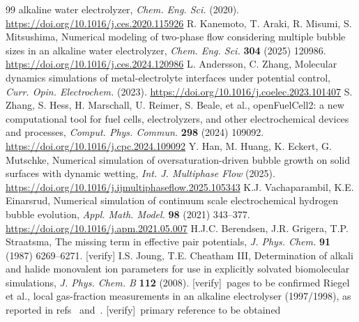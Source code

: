 \documentclass[11pt,a4paper]{article}
\newcommand{\verifyc}{\textcolor{brick}{\footnotesize[verify]}}
\begin{document}
\begin{thebibliography}{99}
alkaline water electrolyzer, \emph{Chem. Eng. Sci.} (2020).
\url{https://doi.org/10.1016/j.ces.2020.115926}
 R. Kanemoto, T. Araki, R. Misumi, S. Mitsushima, Numerical modeling of
two-phase flow considering multiple bubble sizes in an alkaline water electrolyzer,
\emph{Chem. Eng. Sci.} \textbf{304} (2025) 120986. \url{https://doi.org/10.1016/j.ces.2024.120986}
 L. Andersson, C. Zhang, Molecular dynamics simulations of metal-electrolyte
interfaces under potential control, \emph{Curr. Opin. Electrochem.} (2023).
\url{https://doi.org/10.1016/j.coelec.2023.101407}
 S. Zhang, S. Hess, H. Marschall, U. Reimer, S. Beale, et al., openFuelCell2: a
new computational tool for fuel cells, electrolyzers, and other electrochemical devices and
processes, \emph{Comput. Phys. Commun.} \textbf{298} (2024) 109092.
\url{https://doi.org/10.1016/j.cpc.2024.109092}
 Y. Han, M. Huang, K. Eckert, G. Mutschke, Numerical simulation of
oversaturation-driven bubble growth on solid surfaces with dynamic wetting,
\emph{Int. J. Multiphase Flow} (2025). \url{https://doi.org/10.1016/j.ijmultiphaseflow.2025.105343}
 K.J. Vachaparambil, K.E. Einarsrud, Numerical simulation of continuum scale
electrochemical hydrogen bubble evolution, \emph{Appl. Math. Model.} \textbf{98} (2021) 343--377.
\url{https://doi.org/10.1016/j.apm.2021.05.007}
 H.J.C. Berendsen, J.R. Grigera, T.P. Straatsma, The missing term in effective pair
potentials, \emph{J. Phys. Chem.} \textbf{91} (1987) 6269--6271. \verifyc
{} I.S. Joung, T.E. Cheatham III, Determination of alkali and halide monovalent ion
parameters for use in explicitly solvated biomolecular simulations, \emph{J. Phys. Chem. B}
\textbf{112} (2008). \verifyc\ pages to be confirmed
 Riegel et al., local gas-fraction measurements in an alkaline electrolyser
(1997/1998), as reported in refs~\cite{zarghami2020} and~\cite{li2024}. \verifyc\ primary reference
to be obtained
\end{thebibliography}
\end{document}
